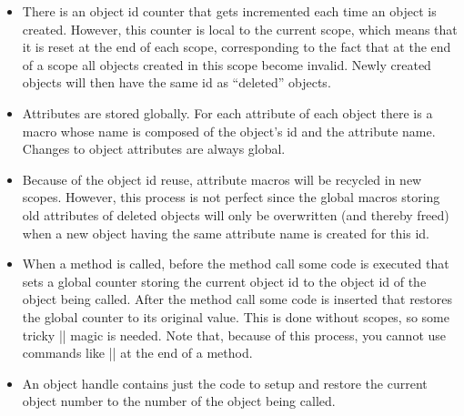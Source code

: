 \begin{itemize}
\item There is an object id counter that gets incremented each time an
  object is created. However, this counter is local to the current
  scope, which means that it is reset at the end of each scope,
  corresponding to the fact that at the end of a scope all objects
  created in this scope become invalid. Newly created objects will
  then have the same id as ``deleted'' objects.
\item Attributes are stored globally. For each attribute of each
  object there is a macro whose name is composed of the object's id
  and the attribute name. Changes to object attributes are always
  global.
\item Because of the object id reuse, attribute macros will be
  recycled in new scopes. However, this process is not perfect since
  the global macros storing old attributes of deleted objects will
  only be overwritten (and thereby freed) when a new object having the
  same attribute name is created for this id.
\item When a method is called, before the method call some code is
  executed that sets a global counter storing the current object id to
  the object id of the object being called. After the method call some
  code is inserted that restores the global counter to its original
  value. This is done without scopes, so some tricky |\expandafter|
  magic is needed. Note that, because of this process, you cannot use
  commands like |\pgfutil@ifnextchar| at the end of a method.
\item An object handle contains just the code to setup and restore the
  current object number to the number of the object being called.
\end{itemize}